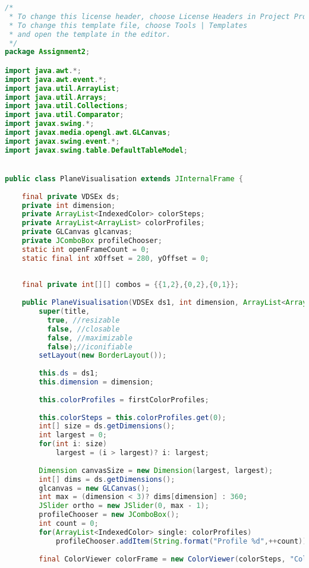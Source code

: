 \documentclass[pdftex,a4paper,10pt,titlepage]{article}
\begin{document}
\begin{lstlisting}[language=java, breaklines=true]
/*
 * To change this license header, choose License Headers in Project Properties.
 * To change this template file, choose Tools | Templates
 * and open the template in the editor.
 */
package Assignment2;

import java.awt.*;
import java.awt.event.*;
import java.util.ArrayList;
import java.util.Arrays;
import java.util.Collections;
import java.util.Comparator;
import javax.swing.*;
import javax.media.opengl.awt.GLCanvas;
import javax.swing.event.*;
import javax.swing.table.DefaultTableModel;


public class PlaneVisualisation extends JInternalFrame {
    
    final private VDSEx ds;
    private int dimension;
    private ArrayList<IndexedColor> colorSteps;
    private ArrayList<ArrayList> colorProfiles;
    private GLCanvas glcanvas;
    private JComboBox profileChooser;
    static int openFrameCount = 0;
    static final int xOffset = 280, yOffset = 0;
    
    
    final private int[][] combos = {{1,2},{0,2},{0,1}};
    
    public PlaneVisualisation(VDSEx ds1, int dimension, ArrayList<ArrayList> firstColorProfiles, String title){
        super(title,
          true, //resizable
          false, //closable
          false, //maximizable
          false);//iconifiable
        setLayout(new BorderLayout());
        
        this.ds = ds1;
        this.dimension = dimension;
        
        this.colorProfiles = firstColorProfiles;
        
        this.colorSteps = this.colorProfiles.get(0);
        int[] size = ds.getDimensions();
        int largest = 0;
        for(int i: size)
            largest = (i > largest)? i: largest;
        
        Dimension canvasSize = new Dimension(largest, largest);
        int[] dims = ds.getDimensions();
        glcanvas = new GLCanvas();
        int max = (dimension < 3)? dims[dimension] : 360;
        JSlider ortho = new JSlider(0, max - 1);
        profileChooser = new JComboBox();
        int count = 0;
        for(ArrayList<IndexedColor> single: colorProfiles)
            profileChooser.addItem(String.format("Profile %d",++count));
        
        final ColorViewer colorFrame = new ColorViewer(colorSteps, "Colors", glcanvas, this);
        

\end{lstlisting}
\end{document}
